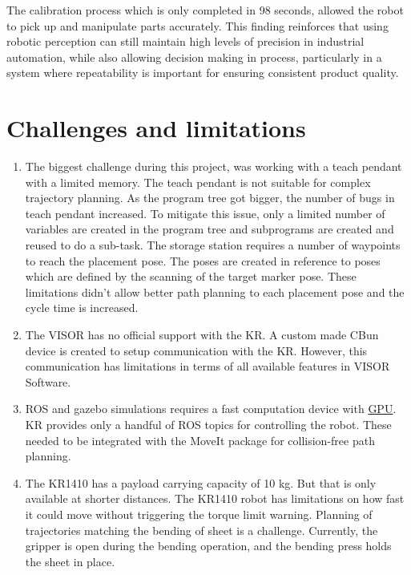 The calibration process which is only completed in 98 seconds, allowed the robot to pick up and manipulate parts accurately. This finding reinforces that using robotic perception can still maintain high levels of precision in industrial automation, while also allowing decision making in process, particularly in a system where repeatability is important for ensuring consistent product quality.

\section{Challenges and limitations}
\begin{enumerate}
    \item The biggest challenge during this project, was working with a teach pendant with a limited memory. The teach pendant is not suitable for complex trajectory planning. As the program tree got bigger, the number of bugs in teach pendant increased. To mitigate this issue, only a limited number of variables are created in the program tree and subprograms are created and reused to do a sub-task. The storage station requires a number of waypoints to reach the placement pose. The poses are created in reference to poses which are defined by the scanning of the target marker pose. These limitations didn't allow better path planning to each placement pose and the cycle time is increased.
    \item The VISOR has no official support with the KR. A custom made CBun device is created to setup communication with the KR. However, this communication has limitations in terms of all available features in VISOR Software.
    \item ROS and gazebo simulations requires a fast computation device with \hyperref[acro:GPU]{GPU}. KR provides only a handful of ROS topics for controlling the robot. These needed to be integrated with the MoveIt package for collision-free path planning.
    \item The KR1410 has a payload carrying capacity of 10 kg. But that is only available at shorter distances. The KR1410 robot has limitations on how fast it could move without triggering the torque limit warning. Planning of trajectories matching the bending of sheet is a challenge. Currently, the gripper is open during the bending operation, and the bending press holds the sheet in place.
\end{enumerate}

